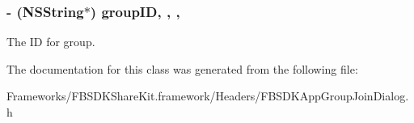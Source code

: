 \subsubsection[{group\+I\+D}]{\setlength{\rightskip}{0pt plus 5cm}-\/ (N\+S\+String$\ast$) group\+I\+D\hspace{0.3cm}{\ttfamily [read]}, {\ttfamily [write]}, {\ttfamily [nonatomic]}, {\ttfamily [copy]}}\label{interface_f_b_s_d_k_app_group_join_dialog_aceeba0e2821c837cd9ae2caf3d6ea890}
The I\+D for group. 

The documentation for this class was generated from the following file\+:\begin{DoxyCompactItemize}
\item 
Frameworks/\+F\+B\+S\+D\+K\+Share\+Kit.\+framework/\+Headers/F\+B\+S\+D\+K\+App\+Group\+Join\+Dialog.\+h\end{DoxyCompactItemize}

